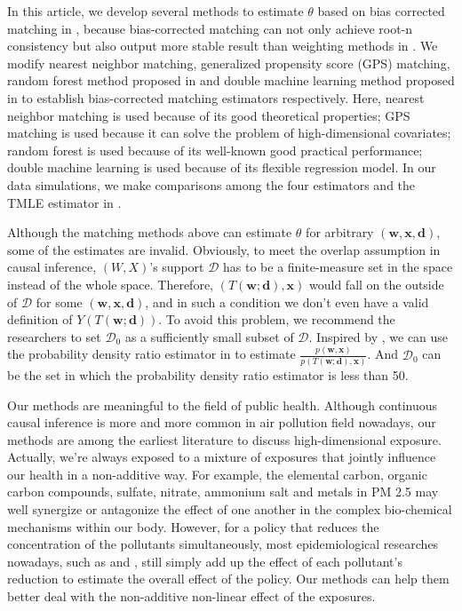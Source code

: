 \documentclass{article}
\theoremstyle{definition}
\newtheorem{proof of proposition}{Proof of Proposition}
\begin{document}
In this article, we develop several methods to estimate $\theta$ based on bias corrected matching in \cite{abadie2011bias}, because bias-corrected matching can not only achieve root-n consistency but also output more stable result than weighting methods in \cite{munoz2012population}. We modify nearest neighbor matching, generalized propensity score (GPS) matching, random forest method proposed in \cite{lin2022regression} and double machine learning method proposed in \cite{lin2021estimation} to establish bias-corrected matching estimators respectively. Here, nearest neighbor matching is used because of its good theoretical properties; GPS matching is used because it can solve the problem of high-dimensional covariates; random forest is used because of its well-known good practical performance; double machine learning is used because of its flexible regression model. In our data simulations, we make comparisons among the four estimators and the TMLE estimator in \cite{mccoy2023semi}. 

Although the matching methods above can estimate $\theta$ for arbitrary $(\mathbf{w},\mathbf{x},\mathbf{d})$, some of the estimates are invalid. Obviously, to meet the overlap assumption in causal inference, $(W,X)$'s support $\mathcal{D}$ has to be a finite-measure set in the space instead of the whole space. Therefore, $(T(\mathbf{w};\mathbf{d}),\mathbf{x})$ would fall on the outside of $\mathcal{D}$ for some $(\mathbf{w},\mathbf{x},\mathbf{d})$, and in such a condition we don't even have a valid definition of $Y(T(\mathbf{w};\mathbf{d}))$. To avoid this problem, we recommend the researchers to set $\mathcal{D}_0$ as a sufficiently small subset of $\mathcal{D}$. Inspired by \cite{mccoy2023semi}, we can use the probability density ratio estimator in \cite{lin2021estimation} to estimate $\frac{p(\mathbf{w},\mathbf{x})}{p(T(\mathbf{w};\mathbf{d}),\mathbf{x})}$. And $\mathcal{D}_0$ can be the set in which the probability density ratio estimator is less than 50.

Our methods are meaningful to the field of public health. Although continuous causal inference is more and more common in air pollution field nowadays, our methods are among the earliest literature to discuss high-dimensional exposure. Actually, we're always exposed to a mixture of exposures that jointly influence our health in a non-additive way. For example, the elemental carbon, organic carbon compounds, sulfate, nitrate, ammonium salt and metals in PM 2.5 may well synergize or antagonize the effect of one another in the complex bio-chemical mechanisms within our body. However, for a policy that reduces the concentration of the pollutants simultaneously, most epidemiological researches nowadays, such as \cite{xiao2021cadmium} and \cite{meng2021short}, still simply add up the effect of each pollutant's reduction to estimate the overall effect of the policy. Our methods can help them better deal with the non-additive non-linear effect of the exposures. 
\end{document}
